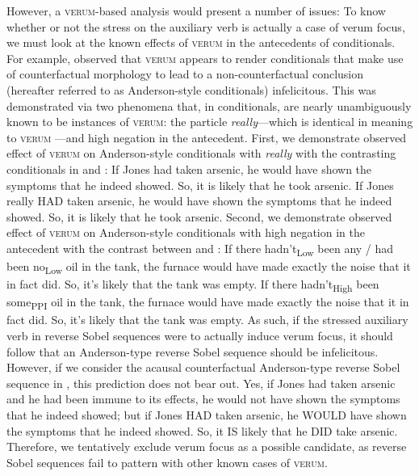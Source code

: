 However, a {\scshape verum}-based analysis would present a number of issues: To know whether or not the stress on the auxiliary verb is actually a case of verum focus, we must look at the known effects of {\scshape verum} in the antecedents of conditionals. For example, \textcite[p.~533]{Romero2015} observed that {\scshape verum} appears to render conditionals that make use of counterfactual morphology to lead to a non-counterfactual conclusion (hereafter referred to as Anderson-style conditionals) infelicitous. This was demonstrated via two phenomena that, in conditionals, are nearly unambiguously known to be instances of {\scshape verum}: the particle \textit{really}---which is identical in meaning to {\scshape verum} \parencite[p.~625]{Romero2004}---and high negation in the antecedent. First, we demonstrate  observed effect of {\scshape verum} on Anderson-style conditionals with \textit{really} with the contrasting conditionals in  and :
\pex
\a If Jones had taken arsenic, he would have shown the symptoms that he indeed showed. So, it is likely that he took arsenic.\hfill\parencite{Anderson1951}
\a\ljudge{\#} If Jones really \MakeUppercase{had} taken arsenic, he would have shown the symptoms that he indeed showed. So, it is likely that he took arsenic.
\xe
Second, we demonstrate  observed effect of {\scshape verum} on Anderson-style conditionals with high negation in the antecedent with the contrast between  and :
\pex
\a If there hadn’t\textsubscript{Low} been any / had been no\textsubscript{Low} oil in the tank, the furnace would have made exactly the noise that it in fact did. So, it’s likely that the tank was empty.\hfill\parencite[p.~521]{Romero2015}
\a \ljudge{\#} If there hadn’t\textsubscript{High} been some\textsubscript{PPI} oil in the tank, the furnace would have made exactly the noise that it in fact did. So, it’s likely that the tank was empty.\hfill\parencite[p.~521]{Romero2015}
\xe
As such, if the stressed auxiliary verb in reverse Sobel sequences were to actually induce verum focus, it should follow that an Anderson-type reverse Sobel sequence should be infelicitous. However, if we consider the acausal counterfactual Anderson-type reverse Sobel sequence in , this prediction does not bear out.
\ex{}
Yes, if Jones had taken arsenic and he had been immune to its effects, he would not have shown the symptoms that he indeed showed; but if Jones \MakeUppercase{had} taken arsenic, he \MakeUppercase{would} have shown the symptoms that he indeed showed. So, it \MakeUppercase{is} likely that he \MakeUppercase{did} take arsenic.
\xe
Therefore, we tentatively exclude verum focus as a possible candidate, as reverse Sobel sequences fail to pattern with other known cases of {\scshape verum}.%

